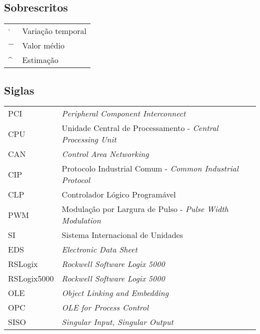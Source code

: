 \subsection*{Sobrescritos}

\begin{tabular}{p{}p{}}
$\cdot$  & Variação temporal \tabularnewline
$-$  & Valor médio \tabularnewline
\textasciicircum & Estimação \tabularnewline
\end{tabular}


\subsection*{Siglas}

\begin{tabular}{p{}p{}}
PCI  & \textit{Peripheral Component Interconnect}\tabularnewline
CPU & Unidade Central de Processamento - \textit{Central Processing Unit} \tabularnewline
CAN & \textit{Control Area Networking} \tabularnewline
CIP & Protocolo Industrial Comum - \textit{Common Industrial Protocol} \tabularnewline
CLP & Controlador Lógico Programável\tabularnewline
PWM &  Modulação por Largura de Pulso - \textit{Pulse Width Modulation}\tabularnewline
SI & Sistema Internacional de Unidades \tabularnewline
EDS & \textit{Electronic Data Sheet}
\tabularnewline
RSLogix & \textit{Rockwell Software Logix 5000}
\tabularnewline
RSLogix5000 & \textit{Rockwell Software Logix 5000}
\tabularnewline
OLE & \textit{Object Linking and Embedding}\tabularnewline
OPC & \textit{OLE for Process Control}\tabularnewline
SISO & \textit{Singular Input, Singular Output}\tabularnewline
\end{tabular}
